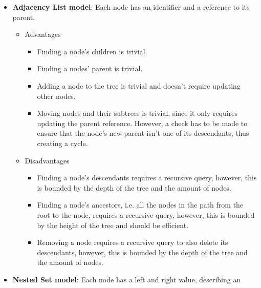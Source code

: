 %
\begin{itemize}
	\item \textbf{Adjacency List model}: Each node has an identifier and a reference to its parent.
	      \begin{itemize}
		      \item Advantages
		            \begin{itemize}
			            \item Finding a node's children is trivial.
			            \item Finding a nodes' parent is trivial.
			            \item Adding a node to the tree is trivial and doesn't require updating other
			                  nodes.
			            \item Moving nodes and their subtrees is trivial, since it only requires updating
			                  the parent reference. However, a check has to be made to ensure that the node's
			                  new parent isn't one of its descendants, thus creating a cycle.
		            \end{itemize}
		      \item Disadvantages
		            \begin{itemize}
			            \item Finding a node's descendants requires a recursive query, however,
			                  this is bounded by the depth of the tree and the amount of nodes.
			            \item Finding a node's ancestors, i.e. all the nodes in the path from the root to
			                  the node, requires a recursive query, however, this is bounded by the height of
			                  the tree and should be efficient.
			            \item Removing a node requires a recursive query to also delete its descendants,
			                  however, this is bounded by the depth of
			                  the tree and the amount of nodes.
		            \end{itemize}
	      \end{itemize}
	\item \textbf{Nested Set model}: Each node has a left and right value, describing an

\end{itemize}
